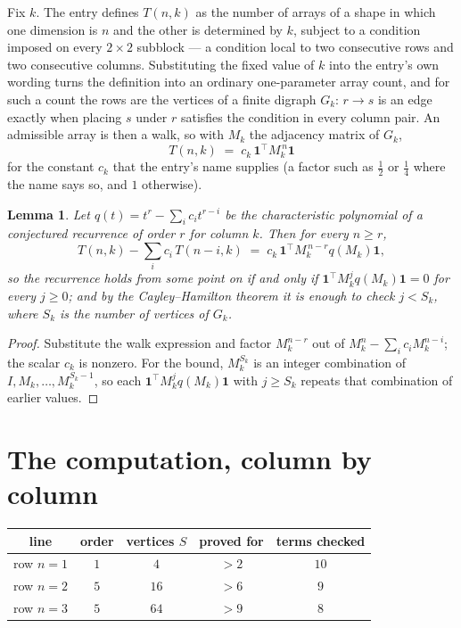 \documentclass[11pt,a4paper]{article}
\theoremstyle{plain}
\newtheorem{lemma}[theorem]{Lemma}
\theoremstyle{definition}
\begin{document}
Fix $k$. The entry defines $T(n,k)$ as the number of arrays of a shape in which one dimension
is $n$ and the other is determined by $k$, subject to a condition imposed on every
$2\times2$ subblock --- a condition local to two consecutive rows and two consecutive columns.
Substituting the fixed value of $k$ into the entry's own wording turns the definition into an
ordinary one-parameter array count, and for such a count the rows are the vertices of a finite
digraph $G_k$: $r\to s$ is an edge exactly when placing $s$ under $r$ satisfies the condition
in every column pair. An admissible array is then a walk, so with $M_k$ the adjacency matrix
of $G_k$,
\[
T(n,k)\;=\;c_k\,\mathbf{1}^{\!\top}M_k^{\,n}\mathbf{1}
\]
for the constant $c_k$ that the entry's name supplies (a factor such as $\tfrac12$ or
$\tfrac14$ where the name says so, and $1$ otherwise).

\begin{lemma}\label{lem:crit}
Let $q(t)=t^{r}-\sum_i c_it^{r-i}$ be the characteristic polynomial of a conjectured
recurrence of order $r$ for column $k$. Then for every $n\ge r$,
\[
T(n,k)-\sum_i c_i\,T(n-i,k)\;=\;c_k\,\mathbf{1}^{\!\top}M_k^{\,n-r}q(M_k)\mathbf{1},
\]
so the recurrence holds from some point on if and only if
$\mathbf{1}^{\!\top}M_k^{j}q(M_k)\mathbf{1}=0$ for every $j\ge0$; and by the
Cayley--Hamilton theorem it is enough to check $j<S_k$, where $S_k$ is the number of vertices
of $G_k$.
\end{lemma}

\begin{proof}
Substitute the walk expression and factor $M_k^{n-r}$ out of $M_k^{n}-\sum_ic_iM_k^{n-i}$;
the scalar $c_k$ is nonzero. For the bound, $M_k^{S_k}$ is an integer combination of
$I,M_k,\dots,M_k^{S_k-1}$, so each $\mathbf{1}^{\!\top}M_k^{j}q(M_k)\mathbf{1}$ with
$j\ge S_k$ repeats that combination of earlier values.
\end{proof}

\section{The computation, column by column}

\begin{center}
\begin{tabular}{ccccc}
line & order & vertices $S$ & proved for & terms checked \\ \hline
row $n$$=1$ & $1$ & $4$ & $>2$ & $10$ \\
row $n$$=2$ & $5$ & $16$ & $>6$ & $9$ \\
row $n$$=3$ & $5$ & $64$ & $>9$ & $8$ \\
\end{tabular}
\end{center}
\end{document}
